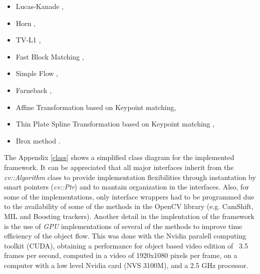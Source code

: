 \begin{itemize}
  \item Lucas-Kanade \cite{c31},
  \item Horn \cite{c30},
  \item TV-L1 \cite{c32},
  \item Fast Block Matching \cite{c50}, 
  \item Simple Flow \cite{c21},
  \item Farneback \cite{c28},
  \item Affine Transformation based on Keypoint matching,
  \item Thin Plate Spline Transformation based on Keypoint matching \cite{c49},
  \item Brox method \cite{c29}.
\end{itemize}

The Appendix \ref{class} shows a simplified class diagram for the implemented framework. It can be appreciated that all major interfaces inherit from the {\it cv::Algorithm} class to provide 
implementation flexibilities through instantation by smart pointers ({\it cv::Ptr}) and to mantain organization in the interfaces. Also, for some of the implementations, only interface wrappers 
had to be programmed due to the availability of some of the methods in the OpenCV library (e.g. CamShift, MIL and Boosting trackers). Another detail in the 
implentation of the framework is the use of {\it GPU} implementations of several of the methods to improve time efficiency of the object flow. This was done with the Nvidia
paralell computing toolkit (CUDA), obtaining a performance for object based video edition of ~3.5 frames per second, computed in a video of 1920x1080 pixels per frame, on a computer with a 
low level Nvidia card (NVS 3100M), and a 2.5 GHz processor.

